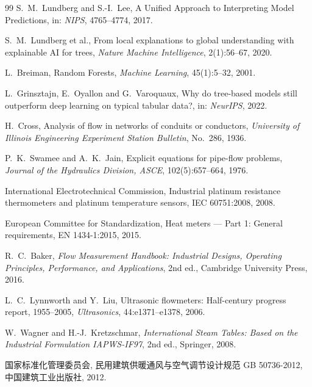 \documentclass[11pt,a4paper]{ctexart}
\begin{document}
\begin{thebibliography}{99}
S.~M.~Lundberg and S.-I.~Lee,
\newblock A Unified Approach to Interpreting Model Predictions,
\newblock in: \emph{NIPS}, 4765--4774, 2017.

S.~M.~Lundberg et al.,
\newblock From local explanations to global understanding with explainable AI for trees,
\newblock \emph{Nature Machine Intelligence}, 2(1):56--67, 2020.

L.~Breiman,
\newblock Random Forests,
\newblock \emph{Machine Learning}, 45(1):5--32, 2001.

L.~Grinsztajn, E.~Oyallon and G.~Varoquaux,
\newblock Why do tree-based models still outperform deep learning on typical tabular data?,
\newblock in: \emph{NeurIPS}, 2022.

H.~Cross,
\newblock Analysis of flow in networks of conduits or conductors,
\newblock \emph{University of Illinois Engineering Experiment Station Bulletin}, No.~286, 1936.

P.~K.~Swamee and A.~K.~Jain,
\newblock Explicit equations for pipe-flow problems,
\newblock \emph{Journal of the Hydraulics Division, ASCE}, 102(5):657--664, 1976.

International Electrotechnical Commission,
\newblock Industrial platinum resistance thermometers and platinum temperature sensors,
\newblock IEC 60751:2008, 2008.

European Committee for Standardization,
\newblock Heat meters --- Part 1: General requirements,
\newblock EN 1434-1:2015, 2015.

R.~C.~Baker,
\newblock \emph{Flow Measurement Handbook: Industrial Designs, Operating Principles, Performance, and Applications},
\newblock 2nd ed., Cambridge University Press, 2016.

L.~C.~Lynnworth and Y.~Liu,
\newblock Ultrasonic flowmeters: Half-century progress report, 1955--2005,
\newblock \emph{Ultrasonics}, 44:e1371--e1378, 2006.

W.~Wagner and H.-J.~Kretzschmar,
\newblock \emph{International Steam Tables: Based on the Industrial Formulation IAPWS-IF97},
\newblock 2nd ed., Springer, 2008.

国家标准化管理委员会,
\newblock 民用建筑供暖通风与空气调节设计规范 GB 50736-2012,
\newblock 中国建筑工业出版社, 2012.


\end{thebibliography}
\end{document}
